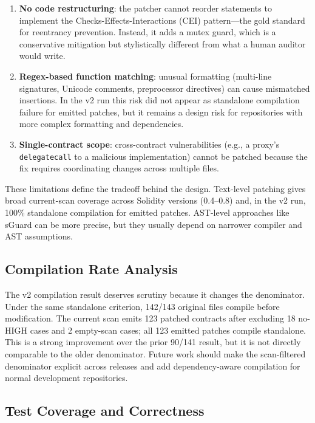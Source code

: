 \documentclass[conference]{IEEEtran}
\begin{document}
\begin{enumerate}
    \item \textbf{No code restructuring}: the patcher cannot reorder statements to implement the Checks-Effects-Interactions (CEI) pattern---the gold standard for reentrancy prevention. Instead, it adds a mutex guard, which is a conservative mitigation but stylistically different from what a human auditor would write.
    \item \textbf{Regex-based function matching}: unusual formatting (multi-line signatures, Unicode comments, preprocessor directives) can cause mismatched insertions. In the v2 run this risk did not appear as standalone compilation failure for emitted patches, but it remains a design risk for repositories with more complex formatting and dependencies.
    \item \textbf{Single-contract scope}: cross-contract vulnerabilities (e.g., a proxy's \texttt{delegatecall} to a malicious implementation) cannot be patched because the fix requires coordinating changes across multiple files.
\end{enumerate}

These limitations define the tradeoff behind the design. Text-level patching gives broad current-scan coverage across Solidity versions (0.4--0.8) and, in the v2 run, 100\% standalone compilation for emitted patches. AST-level approaches like sGuard can be more precise, but they usually depend on narrower compiler and AST assumptions.

\subsection{Compilation Rate Analysis}

The v2 compilation result deserves scrutiny because it changes the denominator. Under the same standalone criterion, 142/143 original files compile before modification. The current scan emits 123 patched contracts after excluding 18 no-HIGH cases and 2 empty-scan cases; all 123 emitted patches compile standalone. This is a strong improvement over the prior 90/141 result, but it is not directly comparable to the older denominator. Future work should make the scan-filtered denominator explicit across releases and add dependency-aware compilation for normal development repositories.

\subsection{Test Coverage and Correctness}
\end{document}
